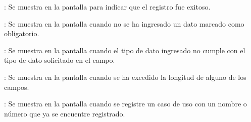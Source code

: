 \begin{Citemize}
	\item {}: Se muestra en la pantalla  para indicar que el registro fue exitoso.
	\item {}: Se muestra en la pantalla  cuando no se ha ingresado un dato marcado como obligatorio.
	\item {}: Se muestra en la pantalla  cuando el tipo de dato ingresado no cumple con el tipo de dato solicitado en el campo.
	\item {}: Se muestra en la pantalla  cuando se ha excedido la longitud de alguno de los campos.
	\item {}: Se muestra en la pantalla  cuando se registre un caso de uso con un nombre o número que ya se encuentre registrado.
\end{Citemize}
